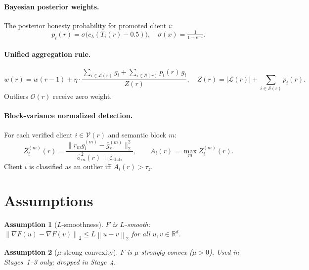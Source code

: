 \documentclass{article}
\newtheorem{assumption}{Assumption}
\newcommand{\R}{\mathbb{R}}
\newcommand{\norm}[1]{\left\lVert #1 \right\rVert}
\newcommand{\calV}{\mathcal{V}}
\newcommand{\calS}{\mathcal{S}}
\newcommand{\calL}{\mathcal{L}}
\newcommand{\calO}{\mathcal{O}}
\newcommand{\gF}{\nabla F}
\begin{document}
\paragraph{Bayesian posterior weights.}
The posterior honesty probability for promoted client $i$:
\begin{equation}
  p_i(r) = \sigma\!\bigl(c_\lambda(T_i(r) - 0.5)\bigr),
  \quad
  \sigma(x) = \tfrac{1}{1+e^{-x}}.
  \label{eq:posterior_weight}
\end{equation}

\paragraph{Unified aggregation rule.}
\begin{equation}
  w(r) = w(r{-}1) + \eta \cdot
  \frac{
    \displaystyle\sum_{i \in \calL(r)} g_i
    + \sum_{i \in \calS(r)} p_i(r)\, g_i
  }{
    Z(r)
  },
  \quad
  Z(r) = |\calL(r)| + \sum_{i \in \calS(r)} p_i(r).
  \label{eq:aggregation}
\end{equation}
Outliers $\calO(r)$ receive zero weight.

\paragraph{Block-variance normalized detection.}
For each verified client $i \in \calV(r)$ and semantic block $m$:
\begin{equation}
  Z_i^{(m)}(r)
  = \frac{\bigl\lVert r_m g_i^{(m)} - \bar{g}_r^{(m)} \bigr\rVert_2^2}
         {\hat\sigma_m^2(r) + \varepsilon_{\mathrm{stab}}},
  \qquad
  A_i(r) = \max_m Z_i^{(m)}(r).
  \label{eq:anomaly_score}
\end{equation}
Client $i$ is classified as an outlier iff $A_i(r) > \tau_z$.

\section{Assumptions}
\label{sec:assumptions}

\begin{assumption}[$L$-smoothness]
\label{assump:smooth}
$F$ is $L$-smooth: $\norm{\gF(u) - \gF(v)}_2 \leq L\norm{u-v}_2$ for all
$u,v \in \R^d$.
\end{assumption}

\begin{assumption}[$\mu$-strong convexity]
\label{assump:convex}
$F$ is $\mu$-strongly convex ($\mu > 0$).
Used in Stages~1--3 only; dropped in Stage~4.
\end{assumption}
\end{document}
